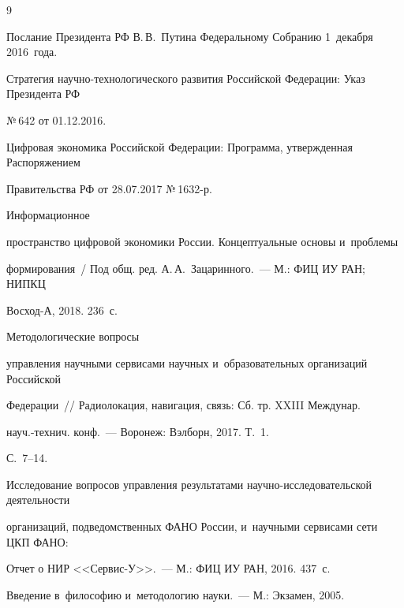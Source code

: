 {\small\frenchspacing

{%


\begin{thebibliography}{9}


Послание Президента РФ В.\,В.~Путина Федеральному Собранию 1~декабря 2016~года.


Стратегия научно-технологического развития Российской Федерации: Указ Президента РФ 

№\,642 от 01.12.2016.


Цифровая экономика Российской Федерации: Программа, утвержденная Распоряжением 

Правительства РФ от 28.07.2017 №\,1632-р.


 Информационное 

пространство цифровой экономики России. Концептуальные основы и~проблемы 

формирования~/ Под общ. ред. А.\,А.~Зацаринного.~--- М.: ФИЦ ИУ РАН; НИПКЦ  

Восход-А, 2018. 236~с. 


 Методологические вопросы 

управления научными сервисами научных и~образовательных организаций Российской 

Федерации~/\!\!/ Радиолокация, навигация, связь: Сб. тр. XXIII Междунар.  

науч.-технич. конф.~--- Воронеж: Вэлборн, 2017.   Т.~1.

С.~7--14.


Исследование вопросов управления результатами научно-исследовательской деятельности 

организаций, подведомственных ФАНО России, и~научными сервисами сети ЦКП ФАНО: 

Отчет о НИР <<Сервис-У>>.~--- М.: ФИЦ ИУ РАН, 2016. 437~с. 


Введение в~философию и~методологию науки.~--- М.: Экзамен, 2005. 


\end{thebibliography}}}
